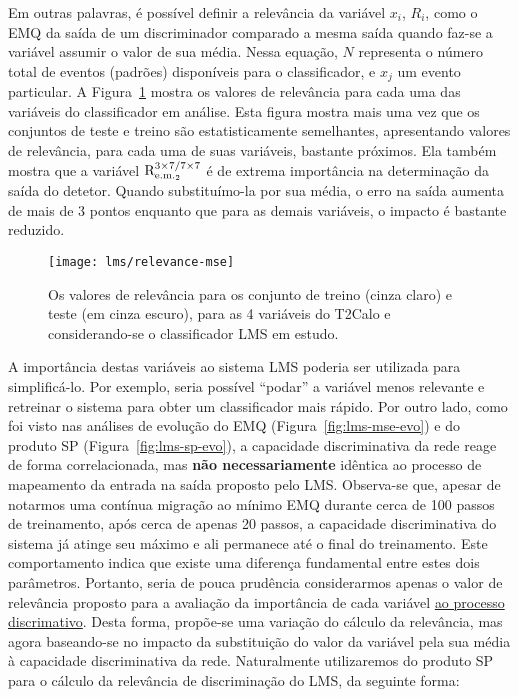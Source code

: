 Em outras palavras, é possível definir a relevância da variável $x_i$, $R_i$,
como o EMQ da saída de um discriminador comparado a mesma saída quando faz-se
a variável assumir o valor de sua média. Nessa equação, $N$ representa o
número total de eventos (padrões) disponíveis para o classificador, e $x_j$ um
evento particular. A Figura~\ref{fig:relevance-mse} mostra os valores de
relevância para cada uma das variáveis do classificador em análise. Esta
figura mostra mais uma vez que os conjuntos de teste e treino são
estatisticamente semelhantes, apresentando valores de relevância, para cada
uma de suas variáveis, bastante próximos. Ela também mostra que a variável
$\text{R}^{3\times7/7\times7}_{\text{e.m.}_{2}}$ é de extrema importância na determinação da saída do detetor. Quando
substituímo-la por sua média, o erro na saída aumenta de mais de 3 pontos
enquanto que para as demais variáveis, o impacto é bastante reduzido.

\begin{figure}
\begin{center}
\texttt{[image: lms/relevance-mse]}
\end{center}
\caption{Os valores de relevância para os conjunto de treino (cinza claro) e
teste (em cinza escuro), para as 4 variáveis do T2Calo e considerando-se o
classificador LMS em estudo.}
\label{fig:relevance-mse}
\end{figure}

A importância destas variáveis ao sistema LMS poderia ser utilizada para
simplificá-lo. Por exemplo, seria possível ``podar'' a variável menos
relevante e retreinar o sistema para obter um classificador mais rápido. Por
outro lado, como foi visto nas análises de evolução do EMQ
(Figura~\ref{fig:lms-mse-evo}) e do produto SP (Figura~\ref{fig:lms-sp-evo}),
a capacidade discriminativa da rede reage de forma correlacionada, mas
\textbf{não necessariamente} idêntica ao processo de mapeamento da entrada na
saída proposto pelo LMS. Observa-se que, apesar de notarmos uma contínua
migração ao mínimo EMQ durante cerca de 100 passos de treinamento, após cerca
de apenas 20 passos, a capacidade discriminativa do sistema já atinge seu
máximo e ali permanece até o final do treinamento. Este comportamento indica
que existe uma diferença fundamental entre estes dois parâmetros. Portanto,
seria de pouca prudência considerarmos apenas o valor de relevância proposto
para a avaliação da importância de cada variável \underline{ao processo
discrimativo}. Desta forma, propõe-se uma variação do cálculo da relevância,
mas agora baseando-se no impacto da substituição do valor da variável pela sua
média à capacidade discriminativa da rede. Naturalmente utilizaremos do
produto SP para o cálculo da relevância de discriminação do LMS, da seguinte
forma:

